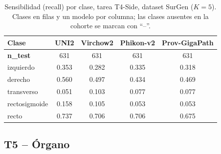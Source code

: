\begin{table}[H]
\centering
\caption{Sensibilidad (recall) por clase, tarea T4-Side, dataset SurGen ($K=5$). Clases en filas y un modelo por columna; las clases ausentes en la cohorte se marcan con ``--''.}
\label{tab:anexo_side_sensibilidad_surgen}
\begin{tabular}{l c c c c}
\toprule
\textbf{Clase} & \textbf{UNI2} & \textbf{Virchow2} & \textbf{Phikon-v2} & \textbf{Prov-GigaPath} \\
\midrule
\textbf{n\_test} & 631 & 631 & 631 & 631 \\
izquierdo & 0.353 & 0.282 & 0.335 & 0.318 \\
derecho & 0.560 & 0.497 & 0.434 & 0.469 \\
transverso & 0.051 & 0.103 & 0.077 & 0.077 \\
rectosigmoide & 0.158 & 0.105 & 0.053 & 0.053 \\
recto & 0.737 & 0.706 & 0.706 & 0.675 \\
\bottomrule
\end{tabular}
\end{table}

\subsection{T5 -- Órgano}

\begin{table}[H]
\centering
\caption{Utilidad global por modelo, tarea T5-Organ. IC 95\% obtenido por bootstrap (1000 remuestreos, a nivel de paciente).}
\label{tab:anexo_organ_utilidad}
\end{table}

